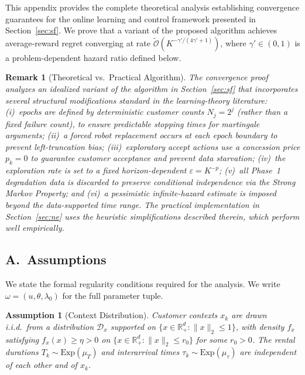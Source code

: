 \documentclass[letterpaper, 10 pt, conference]{IEEEconf}
\newtheorem{remark}{Remark}
\newtheorem{assumption}{Assumption}
\begin{document}
This appendix provides the complete theoretical analysis establishing convergence guarantees for the online learning and control framework presented in Section~\ref{sec:sf}. We prove that a variant of the proposed algorithm achieves average-reward regret converging at rate $\widetilde{\mathcal{O}}(K^{-\gamma'/(4\gamma'+1)})$, where $\gamma' \in (0,1)$ is a problem-dependent hazard ratio defined below.

\begin{remark}[Theoretical vs.\ Practical Algorithm]
The convergence proof analyzes an idealized variant of the algorithm in Section~\ref{sec:sf} that incorporates several structural modifications standard in the learning-theory literature: (i)~epochs are defined by deterministic customer counts $N_j = 2^j$ (rather than a fixed failure count), to ensure predictable stopping times for martingale arguments; (ii)~a forced robot replacement occurs at each epoch boundary to prevent left-truncation bias; (iii)~exploratory accept actions use a concession price $p_k = 0$ to guarantee customer acceptance and prevent data starvation; (iv)~the exploration rate is set to a fixed horizon-dependent $\varepsilon = K^{-p}$; (v)~all Phase~1 degradation data is discarded to preserve conditional independence via the Strong Markov Property; and (vi)~a pessimistic infinite-hazard estimate is imposed beyond the data-supported time range. The practical implementation in Section~\ref{sec:ne} uses the heuristic simplifications described therein, which perform well empirically.
\end{remark}

\subsection*{A.~Assumptions}

We state the formal regularity conditions required for the analysis. We write $\omega = (u, \theta, \lambda_0)$ for the full parameter tuple.

\begin{assumption}[Context Distribution]
\label{ass:context}
Customer contexts $x_k$ are drawn i.i.d.\ from a distribution $\mathcal{D}_x$ supported on $\{x \in \mathbb{R}^d_+ : \|x\|_2 \leq 1\}$, with density $f_x$ satisfying $f_x(x) \geq \eta > 0$ on $\{x \in \mathbb{R}^d_+ : \|x\|_2 \leq r_0\}$ for some $r_0 > 0$. The rental durations $T_k \sim \mathrm{Exp}(\mu_T)$ and interarrival times $\tau_k \sim \mathrm{Exp}(\mu_\tau)$ are independent of each other and of $x_k$.
\end{assumption}
\end{document}
